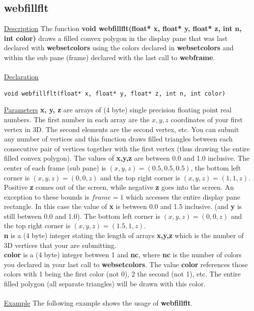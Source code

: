 \subsection{webfillflt}
\label{sec:2-6}
\underline{Description} The function \textbf{void webfillflt(float* x, float* y, float* z, int n, int color)} draws a filled convex polygon in the display pane
that was last declared with \textbf{websetcolors} using the colors declared in \textbf{websetcolors} and within the sub pane (frame)
declared with the last call to \textbf{webframe}.\\
\\
\underline{Declaration}
\begin{verbatim}
void webfillflt(float* x, float* y, float* z, int n, int color)
\end{verbatim}
\underline{Parameters} \textbf{x, y, z} are arrays of (4 byte) single precision floating point real numbers. The first number in each array
are the $x,y,z$ coordinates of your first vertex in 3D. The second elements are the second vertex, etc. You can submit any number of vertices 
and this function draws filled triangles between each consecutive pair of vertices together with the first vertex (thus drawing the entire filled convex polygon). 
The values of \textbf{x,y,z} are between 0.0 and 1.0 inclusive.
The center of each frame (sub pane) is $(x,y,z)=(0.5,0.5,0.5)$, the bottom left corner is $(x,y,z)=(0,0,z)$ and the top right corner is $(x,y,z)=(1,1,z)$.
Positive \textbf{z} comes out of the screen, while negative \textbf{z} goes into the screen.
An exception to these bounds is $frame = 1$ which accesses the entire display pane rectangle. 
In this case the value of \textbf{x} is between 0.0 and 1.5 inclusive. (and \textbf{y} is still between 0.0 and 1.0). The 
bottom left corner is $(x,y,z)=(0,0,z)$ and the top right corner is $(x,y,z)=(1.5,1,z)$.\\
\textbf{n} is a (4 byte) integer stating the length of arrays \textbf{x,y,z} which is the number of 3D vertices that your are submitting.\\
\textbf{color} is a (4 byte) integer between 1 and \textbf{nc}, where \textbf{nc} is the number of colors you declared in your last call
to \textbf{websetcolors}. The value \textbf{color} references those colors with 1 being the first color (not 0), 2 the second (not 1), etc. 
The entire filled polygon (all separate triangles) will be drawn with this color.\\
\\
\underline{Example} The following example shows the usage of \textbf{webfillflt}.
